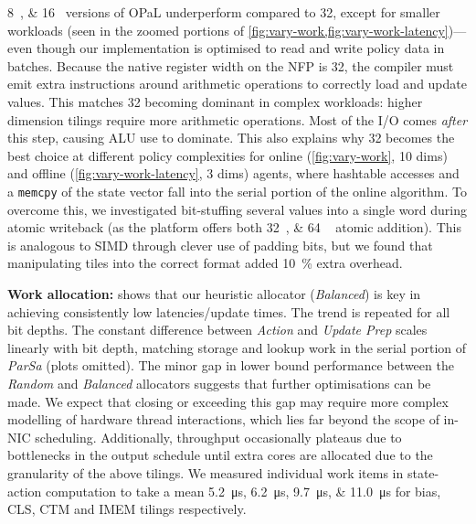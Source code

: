 \documentclass[
sigconf,natbib=false
,anonymous=true
,10pt
]{acmart}
\newcommand{\fakepara}[1]{\noindent\textbf{#1:}}
\newcommand{\approachshort}{OPaL}
\begin{document}
\SIlist{8;16}{\bit} versions of \approachshort{} underperform compared to \SI{32}{\bit}, except for smaller workloads (seen in the zoomed portions of \cref{fig:vary-work,fig:vary-work-latency})---even though our implementation is optimised to read and write policy data in batches.
Because the native register width on the NFP is \SI{32}{\bit}, the compiler must emit extra instructions around arithmetic operations to correctly load and update values.
This matches \SI{32}{\bit} becoming dominant in complex workloads: higher dimension tilings require more arithmetic operations.
Most of the I/O comes \emph{after} this step, causing ALU use to dominate.
This also explains why \SI{32}{\bit} becomes the best choice at different policy complexities for online (\cref{fig:vary-work}, 10 dims) and offline (\cref{fig:vary-work-latency}, 3 dims) agents, where hashtable accesses and a \texttt{memcpy} of the state vector fall into the serial portion of the online algorithm.
To overcome this, we investigated bit-stuffing several values into a single word during atomic writeback (as the platform offers both \SIlist{32;64
}{\bit} atomic addition).
This is analogous to SIMD through clever use of padding bits, but we found that manipulating tiles into the correct format added \SI{10}{\percent} extra overhead.

\fakepara{Work allocation}
 shows that our heuristic allocator (\emph{Balanced}) is key in achieving consistently low latencies/update times.
The trend is repeated for all bit depths.
The constant difference between \emph{Action} and \emph{Update Prep} scales linearly with bit depth, matching storage and lookup work in the serial portion of \emph{ParSa} (plots omitted).
The minor gap in lower bound performance between the \emph{Random} and \emph{Balanced} allocators suggests that further optimisations can be made.
We expect that closing or exceeding this gap may require more complex modelling of hardware thread interactions, which lies far beyond the scope of in-NIC scheduling.
Additionally, throughput occasionally plateaus due to bottlenecks in the output schedule until extra cores are allocated due to the granularity of the above tilings.
We measured individual work items in state-action computation to take a mean \SIlist{5.2; 6.2; 9.7; 11.0}{\micro\second} for bias, CLS, CTM and IMEM tilings respectively.
\end{document}
